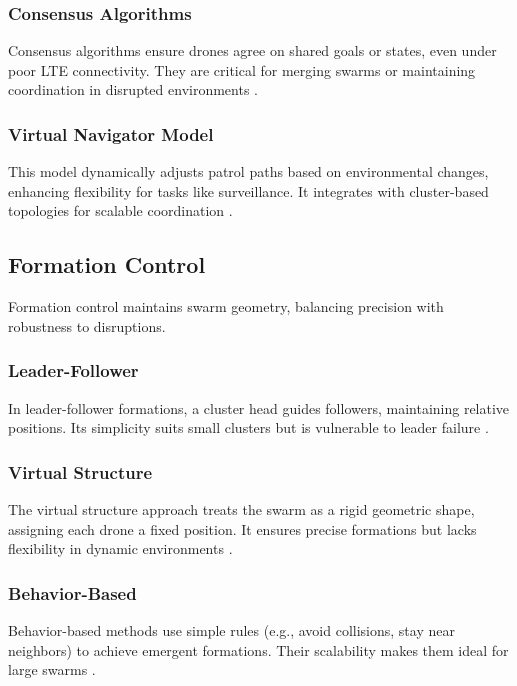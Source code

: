 \documentclass{article}
\begin{document}
\subsubsection{Consensus Algorithms}
Consensus algorithms ensure drones agree on shared goals or states, even under poor LTE connectivity. They are critical for merging swarms or maintaining coordination in disrupted environments \cite{OlfatiSaber2007, Ren2007}.

\subsubsection{Virtual Navigator Model}
This model dynamically adjusts patrol paths based on environmental changes, enhancing flexibility for tasks like surveillance. It integrates with cluster-based topologies for scalable coordination \cite{Low2019, Zhang2022}.

\subsection{Formation Control}
Formation control maintains swarm geometry, balancing precision with robustness to disruptions.

\subsubsection{Leader-Follower}
In leader-follower formations, a cluster head guides followers, maintaining relative positions. Its simplicity suits small clusters but is vulnerable to leader failure \cite{Consolini2008, Wang2019}.

\subsubsection{Virtual Structure}
The virtual structure approach treats the swarm as a rigid geometric shape, assigning each drone a fixed position. It ensures precise formations but lacks flexibility in dynamic environments \cite{Lewis1997, Ren2008}.

\subsubsection{Behavior-Based}
Behavior-based methods use simple rules (e.g., avoid collisions, stay near neighbors) to achieve emergent formations. Their scalability makes them ideal for large swarms \cite{Balch1998, Reynolds2000}.
\end{document}
